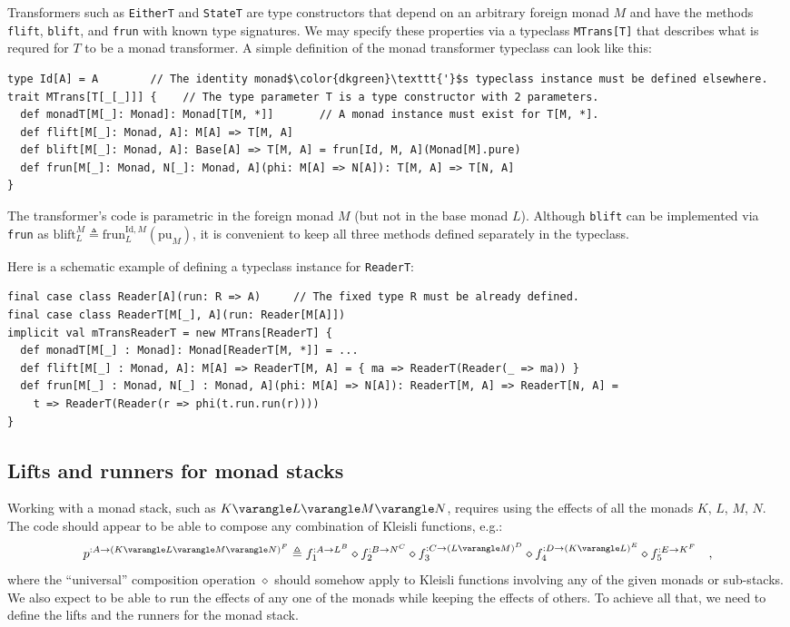 Transformers such as \lstinline!EitherT! and \lstinline!StateT!
are type constructors that depend on an arbitrary foreign monad $M$
and have the methods \lstinline!flift!, \lstinline!blift!, and \lstinline!frun!
with known type signatures. We may specify these properties via a
typeclass \lstinline!MTrans[T]! that describes what is requred for
$T$ to be a monad transformer. A simple definition of the monad transformer
typeclass can look like this:
\begin{lstlisting}[mathescape=true]
type Id[A] = A        // The identity monad$\color{dkgreen}\texttt{'}$s typeclass instance must be defined elsewhere.
trait MTrans[T[_[_]]] {    // The type parameter T is a type constructor with 2 parameters.
  def monadT[M[_]: Monad]: Monad[T[M, *]]       // A monad instance must exist for T[M, *].
  def flift[M[_]: Monad, A]: M[A] => T[M, A]
  def blift[M[_]: Monad, A]: Base[A] => T[M, A] = frun[Id, M, A](Monad[M].pure)
  def frun[M[_]: Monad, N[_]: Monad, A](phi: M[A] => N[A]): T[M, A] => T[N, A]
}
\end{lstlisting}
The transformer\textsf{'}s code is parametric in the foreign monad $M$ (but
not in the base monad $L$). Although \lstinline!blift! can be implemented
via \lstinline!frun! as $\text{blift}_{L}^{M}\triangleq\text{frun}_{L}^{\text{Id},M}(\text{pu}_{M})$,
it is convenient to keep all three methods defined separately in the
typeclass.

Here is a schematic example of defining a typeclass instance for \lstinline!ReaderT!:
\begin{lstlisting}
final case class Reader[A](run: R => A)     // The fixed type R must be already defined.
final case class ReaderT[M[_], A](run: Reader[M[A]])
implicit val mTransReaderT = new MTrans[ReaderT] {
  def monadT[M[_] : Monad]: Monad[ReaderT[M, *]] = ...
  def flift[M[_] : Monad, A]: M[A] => ReaderT[M, A] = { ma => ReaderT(Reader(_ => ma)) }
  def frun[M[_] : Monad, N[_] : Monad, A](phi: M[A] => N[A]): ReaderT[M, A] => ReaderT[N, A] =
    t => ReaderT(Reader(r => phi(t.run.run(r))))
}
\end{lstlisting}


\subsection{Lifts and runners for monad stacks}

Working with a monad stack, such as $K\varangle L\varangle M\varangle N$,
requires using the effects of all the monads $K$, $L$, $M$, $N$.
The code should appear to be able to compose any combination of Kleisli
functions, e.g.:
\[
p^{:A\rightarrow(K\varangle L\varangle M\varangle N)^{F}}\triangleq f_{1}^{:A\rightarrow L^{B}}\diamond f_{2}^{:B\rightarrow N^{C}}\diamond f_{3}^{:C\rightarrow(L\varangle M)^{D}}\diamond f_{4}^{:D\rightarrow(K\varangle L)^{E}}\diamond f_{5}^{:E\rightarrow K^{F}}\quad,
\]
where the \textsf{``}universal\textsf{''} composition operation $\diamond$ should
somehow apply to Kleisli functions involving any of the given monads
or sub-stacks. We also expect to be able to run the effects of any
one of the monads while keeping the effects of others. To achieve
all that, we need to define the lifts and the runners for the monad
stack.

